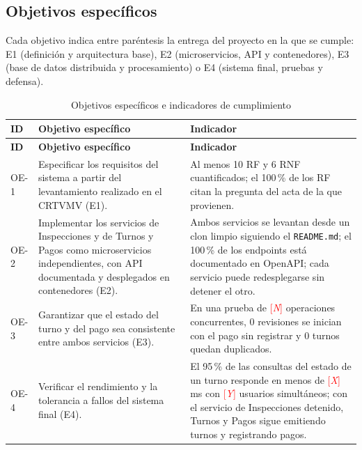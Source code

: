\documentclass[11pt,a4paper]{article}
\newcommand{\pendiente}[1]{\textcolor{red}{[\textit{#1}]}}
\begin{document}
\subsection{Objetivos específicos}
Cada objetivo indica entre paréntesis la entrega del proyecto en la que se cumple: E1 (definición y arquitectura base), E2 (microservicios, API y contenedores), E3 (base de datos distribuida y procesamiento) o E4 (sistema final, pruebas y defensa).
\begin{xltabular}{\textwidth}{lXL{5.2cm}}
  \caption{Objetivos específicos e indicadores de cumplimiento}\label{tab:objetivos}\\
  \toprule
  \textbf{ID} & \textbf{Objetivo específico} & \textbf{Indicador} \\
  \midrule
  \endfirsthead
  \toprule
  \textbf{ID} & \textbf{Objetivo específico} & \textbf{Indicador} \\
  \midrule
  \endhead
  \bottomrule
  \endfoot
  OE-1 & Especificar los requisitos del sistema a partir del levantamiento realizado en el CRTVMV (E1). & Al menos 10 RF y 6 RNF cuantificados; el 100\,\% de los RF citan la pregunta del acta de la que provienen. \\
    OE-2 & Implementar los servicios de Inspecciones y de Turnos y Pagos como microservicios independientes, con API documentada y desplegados en contenedores (E2). & Ambos servicios se levantan desde un clon limpio siguiendo el \texttt{README.md}; el 100\,\% de los endpoints está documentado en OpenAPI; cada servicio puede redesplegarse sin detener el otro. \\
    OE-3 & Garantizar que el estado del turno y del pago sea consistente entre ambos servicios (E3). & En una prueba de \pendiente{N} operaciones concurrentes, 0 revisiones se inician con el pago sin registrar y 0 turnos quedan duplicados. \\
    OE-4 & Verificar el rendimiento y la tolerancia a fallos del sistema final (E4). & El 95\,\% de las consultas del estado de un turno responde en menos de \pendiente{X} ms con \pendiente{Y} usuarios simultáneos; con el servicio de Inspecciones detenido, Turnos y Pagos sigue emitiendo turnos y registrando pagos. \\
\end{xltabular}

\end{document}
